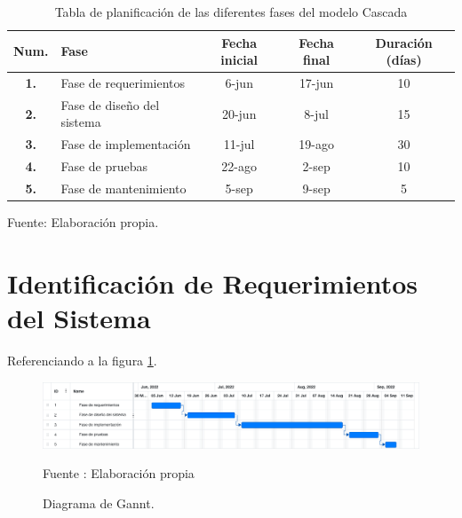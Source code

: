 \begin{table}[H]
    \caption{Tabla de planificación de las diferentes fases del modelo Cascada}
    \label{tabla:ejemplo}
    \begin{center}
        \begin{tabular}{|c|l|c|c|c|}
            \hline
            \textbf{Num.} & \textbf{Fase}  &  \textbf{Fecha inicial} & \textbf{Fecha final} & \textbf{Duración (días)}\\ \hline
            \textbf{1.} & Fase de requerimientos        & 6-jun        & 17-jun        & 10        \\ \hline
            \textbf{2.} & Fase de diseño del sistema       & 20-jun        & 8-jul        & 15        \\ \hline
            \textbf{3.} & Fase de implementación        & 11-jul        & 19-ago        & 30        \\ \hline
            \textbf{4.} & Fase de pruebas        & 22-ago         &   2-sep     &    10     \\ \hline
            \textbf{5.} & Fase de mantenimiento        & 5-sep        & 9-sep        & 5        \\ \hline
        \end{tabular}
        Fuente: Elaboración propia.
    \end{center}
\end{table}

\section{Identificación de Requerimientos del Sistema}
Referenciando a la figura \ref{fig:gannt}.
\begin{figure}[H]
    \begin{center}
        \includegraphics[width=17cm]{img/capitulo_4/gant.png}
        \caption{Diagrama de Gannt.}
        Fuente : Elaboración propia
        \label{fig:gannt}
    \end{center}
\end{figure}





